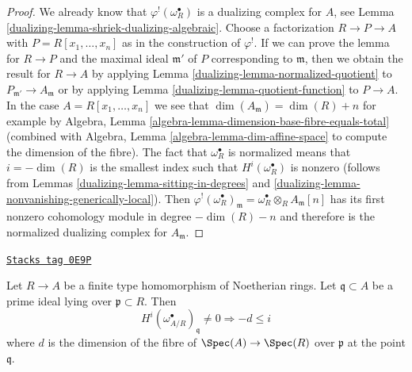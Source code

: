\begin{proof}

We already know that $\varphi^!(\omega_R^\bullet)$ is a dualizing
complex for $A$, see Lemma \ref{dualizing-lemma-shriek-dualizing-algebraic}.
Choose a factorization $R \to P \to A$ with $P = R[x_1, \ldots, x_n]$
as in the construction of $\varphi^!$. If we can prove the
lemma for $R \to P$ and the maximal ideal $\mathfrak m'$ of $P$ corresponding to
$\mathfrak m$, then we obtain the result for $R \to A$ by
applying Lemma \ref{dualizing-lemma-normalized-quotient} to
$P_{\mathfrak m'} \to A_\mathfrak m$ or by applying
Lemma \ref{dualizing-lemma-quotient-function} to $P \to A$.
In the case $A = R[x_1, \ldots, x_n]$ we see that
$\dim(A_\mathfrak m) = \dim(R) + n$ for example by
Algebra, Lemma \ref{algebra-lemma-dimension-base-fibre-equals-total}
(combined with Algebra, Lemma \ref{algebra-lemma-dim-affine-space}
to compute the dimension of the fibre).
The fact that $\omega_R^\bullet$ is normalized means
that $i = -\dim(R)$ is the smallest index such that
$H^i(\omega_R^\bullet)$ is nonzero (follows from
Lemmas \ref{dualizing-lemma-sitting-in-degrees} and
\ref{dualizing-lemma-nonvanishing-generically-local}).
Then $\varphi^!(\omega_R^\bullet)_\mathfrak m =
\omega_R^\bullet \otimes_R A_\mathfrak m[n]$
has its first nonzero cohomology module in degree $-\dim(R) - n$
and therefore is the normalized dualizing complex for $A_\mathfrak m$.
\end{proof}

\begin{lemma}
\label{dualizing-lemma-relative-dualizing-trivial-vanishing}
\href{https://stacks.math.columbia.edu/tag/0E9P}{\texttt{Stacks tag 0E9P}}

Let $R \to A$ be a finite type homomorphism of Noetherian rings.
Let $\mathfrak q \subset A$ be a prime ideal lying over
$\mathfrak p \subset R$. Then
$$
H^i(\omega_{A/R}^\bullet)_\mathfrak q \not = 0
\Rightarrow - d \leq i
$$
where $d$ is the dimension of the fibre of $\Spec(A) \to \Spec(R)$
over $\mathfrak p$ at the point $\mathfrak q$.
\end{lemma}

